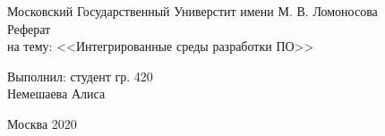 \begin{center} 

\large Московский Государственный Универстит имени М. В. Ломоносова\\[5.5cm] 

\huge Реферат \\[0.6cm] %
\large на тему:  <<Интегрированные среды разработки ПО>>\\[3.7cm]


\end{center} 

\begin{flushright}
Выполнил: студент гр. 420 \\
Немешаева Алиса \\
\end{flushright}


\vfill 

\begin{center} 
\large Москва 2020
\end{center} 

\thispagestyle{empty}
